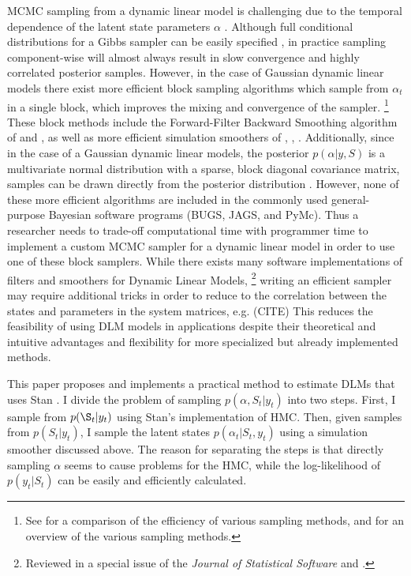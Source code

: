 \documentclass{article}
\begin{document}
MCMC sampling from a dynamic linear model is challenging due to the temporal dependence of the latent state parameters $\alpha$ \parencite{ReisSalazarGamerman2006}.
Although full conditional distributions for a Gibbs sampler can be easily specified \parencite{CarlinGelfandSmith1992}, in practice sampling component-wise will almost always result in slow convergence and highly correlated posterior samples.
However, in the case of Gaussian dynamic linear models there exist more efficient block sampling algorithms which sample from $\alpha_{t}$ in a single block, which improves the mixing and convergence of the sampler.%
\footnote{See \textcite{ReisSalazarGamerman2006} for a comparison of the efficiency of various sampling methods, and \textcite{migon2005dynamic} for an overview of the various sampling methods.}
These block methods include the Forward-Filter Backward Smoothing algorithm of \textcite{CarterKohn1994} and \textcite{Fruehwirth-Schnatter1994}, as well as more efficient simulation smoothers of \textcite{DeJongShephard1995}, \textcite{DurbinKoopman2002}, \textcite{StricklandTurnerDenhamEtAl2009}.%
Additionally, since in the case of a Gaussian dynamic linear models, the posterior $p(\alpha | y, S)$ is a multivariate normal distribution with a sparse, block diagonal covariance matrix, samples can be drawn directly from the posterior distribution \parencites{migon2005dynamic}{ChanJeliazkov2009}.
However, none of these more efficient algorithms are included in the commonly used general-purpose Bayesian software programs (BUGS, JAGS, and PyMc).
Thus a researcher needs to trade-off computational time with programmer time to implement a custom MCMC sampler for a dynamic linear model in order to use one of these block samplers.
While there exists many software implementations of filters and smoothers for Dynamic Linear Models,%
\footnote{Reviewed in a special issue of the \textit{Journal of Statistical Software} \textcite{CommandeurKoopmanOoms2011} and \textcite{Tusell2011}.}
writing an efficient sampler may require additional tricks in order to reduce to the correlation between the states and parameters in the system matrices, e.g. (CITE)
This reduces the feasibility of using DLM models in applications despite their theoretical and intuitive advantages and flexibility for more specialized but already implemented methods.

This paper proposes and implements a practical method to estimate DLMs that uses Stan \parencite{Stan2013}.
I divide the problem of sampling $p(\alpha, S_{t} | y_{t})$ into two steps.
First, I sample from $p(\S_{t} | y_{t})$ using Stan's implementation of HMC.
Then, given samples from $p(S_{t} | y_{t})$, I sample the latent states $p(\alpha_{t} | S_{t}, y_{t})$ using a simulation smoother discussed above.
The reason for separating the steps is that directly sampling $\alpha$ seems to cause problems for the HMC, while the log-likelihood of $p(y_{t} | S_{t})$ can be easily and efficiently calculated.
\end{document}
